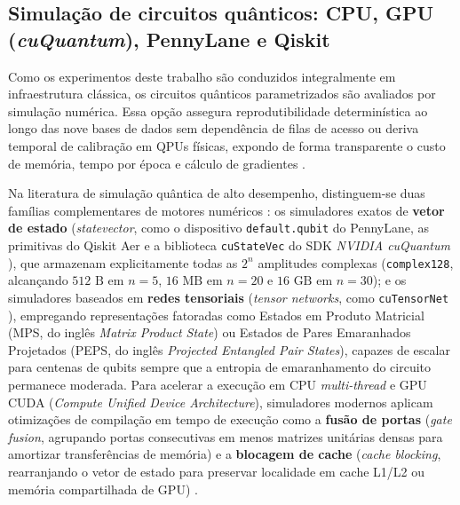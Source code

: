 \documentclass[
    12pt,
    openright,
    oneside,
    a4paper,
    english,
    brazil
]{abntex2}
\begin{document}
\subsection{Simulação de circuitos quânticos: CPU, GPU (\textit{cuQuantum}), PennyLane e Qiskit}
\label{subsec:simulacao_circuitos_qiskit}

Como os experimentos deste trabalho são conduzidos integralmente em infraestrutura clássica, os circuitos quânticos parametrizados são avaliados por simulação numérica. Essa opção assegura reprodutibilidade determinística ao longo das nove bases de dados sem dependência de filas de acesso ou deriva temporal de calibração em QPUs físicas, expondo de forma transparente o custo de memória, tempo por época e cálculo de gradientes \cite{preskill2018nisq,ibmQuantumAerSimulation2026}.

Na literatura de simulação quântica de alto desempenho, distinguem-se duas famílias complementares de motores numéricos \cite{bayraktar2023cuquantum,faj2023warpspeed,chen2024quantumhpcworkflow}: os simuladores exatos de \textbf{vetor de estado} (\textit{statevector}, como o dispositivo \texttt{default.qubit} do PennyLane, as primitivas do Qiskit Aer e a biblioteca \texttt{cuStateVec} do SDK \textit{NVIDIA cuQuantum} \cite{bayraktar2023cuquantum}), que armazenam explicitamente todas as \(2^n\) amplitudes complexas (\texttt{complex128}, alcançando \(512\text{ B}\) em \(n=5\), \(16\text{ MB}\) em \(n=20\) e \(16\text{ GB}\) em \(n=30\)); e os simuladores baseados em \textbf{redes tensoriais} (\textit{tensor networks}, como \texttt{cuTensorNet} \cite{bayraktar2023cuquantum}), empregando representações fatoradas como Estados em Produto Matricial (MPS, do inglês \textit{Matrix Product State}) ou Estados de Pares Emaranhados Projetados (PEPS, do inglês \textit{Projected Entangled Pair States}), capazes de escalar para centenas de qubits sempre que a entropia de emaranhamento do circuito permanece moderada. Para acelerar a execução em CPU \textit{multi-thread} e GPU CUDA (\textit{Compute Unified Device Architecture}), simuladores modernos aplicam otimizações de compilação em tempo de execução como a \textbf{fusão de portas} (\textit{gate fusion}, agrupando portas consecutivas em menos matrizes unitárias densas para amortizar transferências de memória) e a \textbf{blocagem de cache} (\textit{cache blocking}, rearranjando o vetor de estado para preservar localidade em cache L1/L2 ou memória compartilhada de GPU) \cite{faj2023warpspeed,bayraktar2023cuquantum}.
\end{document}
